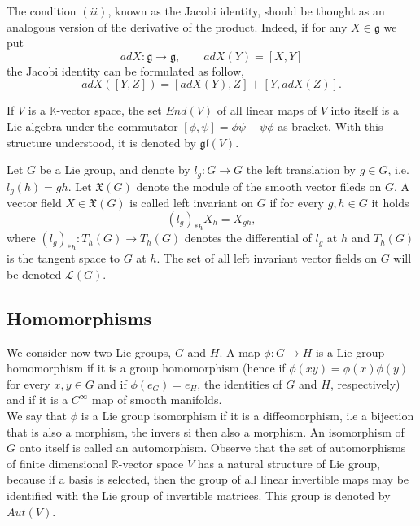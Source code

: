 \documentclass[a4paper,11pt]{article} %
\numberwithin{equation}{section} %
\numberwithin{figure}{section} %
\begin{document}
The condition $(ii)$, known as the Jacobi identity, should be thought as an analogous version of the derivative of the product. Indeed, if  for any $X\in\mathfrak{g}$ we put
\begin{equation}
 ad X:\mathfrak{g}\rightarrow\mathfrak{g},\qquad ad X(Y)=[X,Y]
\end{equation}
the Jacobi identity can be formulated as follow, 
\begin{equation}
 ad X ([Y,Z])=[ad X(Y),Z]+[Y,ad X(Z)]. 
\end{equation}

If  $V$  is a $\mathbb{K}$-vector space, the set  $End (V)$ of all linear maps of $V$ into itself is a Lie algebra under the commutator $[\phi,\psi]=\phi\psi-\psi\phi$ as bracket. With this structure understood, it is denoted by $\mathfrak{gl}(V)$.

Let $G$ be a Lie group, and denote by  $l_g:G\rightarrow G$ the left translation by $g\in G$, i.e. $l_g(h)=gh$. Let $\mathfrak{X}(G)$ denote the module of the smooth vector fileds on $G$. A vector field $X\in\mathfrak{X}(G)$ is called left invariant on $G$ if for every $g,h\in G$ it holds
\begin{equation}
(l_g)_{*h}X_h=X_{gh}, 
\end{equation}
where $(l_g)_{*h}:T_h(G)\rightarrow T_h(G)$ denotes the differential of $l_g$ at $h$ and $T_h(G)$ is the tangent space to $G$ at $h$. The set of all left invariant vector fields on  $G$ will be  denoted $\mathcal{L}(G)$.

\subsection{Homomorphisms}

We consider now two Lie groups, $G$ and $H$. A map $\phi:G\rightarrow H$ is a Lie group homomorphism  if it is a group homomorphism (hence if $\phi(xy)=\phi(x)\phi(y)$ for every $x,y\in G$ and if $\phi(e_G)=e_H$, the identities of $G$ and $H$, respectively) and if it is a $C^\infty$ map of smooth manifolds.\\

We say that $\phi$ is a Lie group isomorphism if it is a diffeomorphism, i.e a bijection that is also a morphism, the invers si then also a morphism. An isomorphism of $G$ onto itself is called an automorphism. Observe that the set of  automorphisms of finite dimensional $\mathbb{R}$-vector space $V$ has a natural structure of Lie group, because if a basis is selected, then the group of all linear invertible maps may be identified with the Lie group of invertible matrices. This group is denoted by $Aut (V)$. \\
\end{document}
